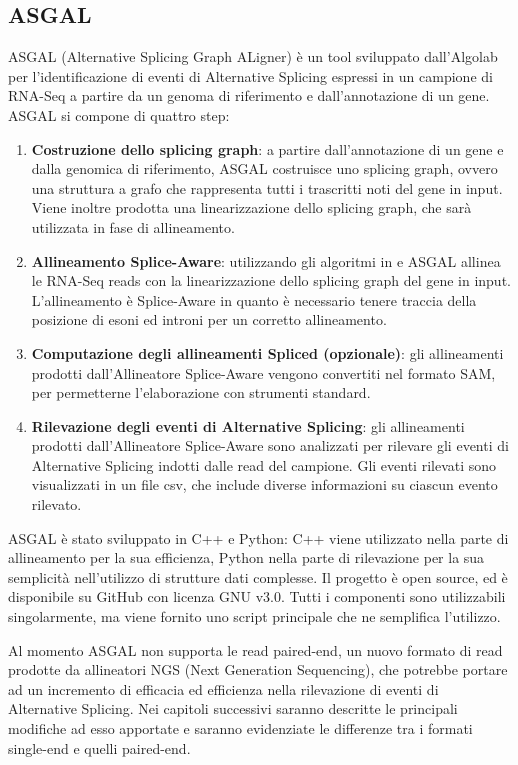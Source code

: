 \subsection{ASGAL}
ASGAL (Alternative Splicing Graph ALigner) \cite{denti2018asgal} è un tool sviluppato dall'Algolab per l'identificazione di eventi di Alternative Splicing espressi in un campione di RNA-Seq a partire da un genoma di riferimento e dall'annotazione di un gene. ASGAL si compone di quattro step:

\begin{enumerate}
	\item \textbf{Costruzione dello splicing graph}: a partire dall'annotazione di un gene e dalla genomica di riferimento, ASGAL costruisce uno splicing graph, ovvero una struttura a grafo che rappresenta tutti i trascritti noti del gene in input. Viene inoltre prodotta una linearizzazione dello splicing graph, che sarà utilizzata in fase di allineamento.
	\item \textbf{Allineamento Splice-Aware}: utilizzando gli algoritmi in \cite{beretta2017mapping} e \cite{ohlebusch2010computing} ASGAL allinea le RNA-Seq reads con la linearizzazione dello splicing graph del gene in input. L'allineamento è Splice-Aware in quanto è necessario tenere traccia della posizione di esoni ed introni per un corretto allineamento.
	\item \textbf{Computazione degli allineamenti Spliced (opzionale)}: gli allineamenti prodotti dall'Allineatore Splice-Aware vengono convertiti nel formato SAM, per permetterne l'elaborazione con strumenti standard.
	\item \textbf{Rilevazione degli eventi di Alternative Splicing}: gli allineamenti prodotti dall'Allineatore Splice-Aware sono analizzati per rilevare gli eventi di Alternative Splicing indotti dalle read del campione. Gli eventi rilevati sono visualizzati in un file csv, che include diverse informazioni su ciascun evento rilevato.
\end{enumerate}

ASGAL è stato sviluppato in C++ e Python: C++ viene utilizzato nella parte di allineamento per la sua efficienza, Python nella parte di rilevazione per la sua semplicità nell'utilizzo di strutture dati complesse. Il progetto è open source, ed è disponibile su GitHub con licenza GNU v3.0. Tutti i componenti sono utilizzabili singolarmente, ma viene fornito uno script principale che ne semplifica l'utilizzo.  

Al momento ASGAL non supporta le read paired-end, un nuovo formato di read prodotte da allineatori NGS (Next Generation Sequencing), che potrebbe portare ad un incremento di efficacia ed efficienza nella rilevazione di eventi di Alternative Splicing. Nei capitoli successivi saranno descritte le principali modifiche ad esso apportate e saranno evidenziate le differenze tra i formati single-end e quelli paired-end.

